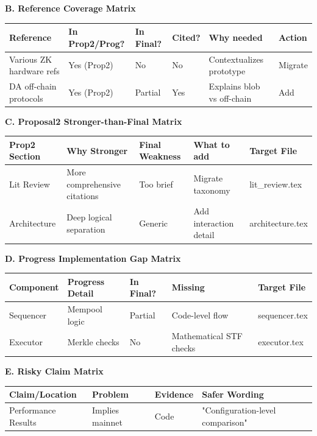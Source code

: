 \documentclass[12pt]{article}
\begin{document}
\vspace{2em}
\noindent\textbf{B. Reference Coverage Matrix} \\
\begin{tabularx}{\textwidth}{|X|l|l|l|X|X|}
\hline
\textbf{Reference} & \textbf{In Prop2/Prog?} & \textbf{In Final?} & \textbf{Cited?} & \textbf{Why needed} & \textbf{Action} \\ \hline
Various ZK hardware refs & Yes (Prop2) & No & No & Contextualizes prototype & Migrate \\ \hline
DA off-chain protocols & Yes (Prop2) & Partial & Yes & Explains blob vs off-chain & Add \\ \hline
\end{tabularx}

\vspace{2em}
\noindent\textbf{C. Proposal2 Stronger-than-Final Matrix} \\
\begin{tabularx}{\textwidth}{|l|X|X|X|l|}
\hline
\textbf{Prop2 Section} & \textbf{Why Stronger} & \textbf{Final Weakness} & \textbf{What to add} & \textbf{Target File} \\ \hline
Lit Review & More comprehensive citations & Too brief & Migrate taxonomy & lit\_review.tex \\ \hline
Architecture & Deep logical separation & Generic & Add interaction detail & architecture.tex \\ \hline
\end{tabularx}

\vspace{2em}
\noindent\textbf{D. Progress Implementation Gap Matrix} \\
\begin{tabularx}{\textwidth}{|l|X|l|X|l|}
\hline
\textbf{Component} & \textbf{Progress Detail} & \textbf{In Final?} & \textbf{Missing} & \textbf{Target File} \\ \hline
Sequencer & Mempool logic & Partial & Code-level flow & sequencer.tex \\ \hline
Executor & Merkle checks & No & Mathematical STF checks & executor.tex \\ \hline
\end{tabularx}

\vspace{2em}
\noindent\textbf{E. Risky Claim Matrix} \\
\begin{tabularx}{\textwidth}{|X|X|X|X|}
\hline
\textbf{Claim/Location} & \textbf{Problem} & \textbf{Evidence} & \textbf{Safer Wording} \\ \hline
Performance Results & Implies mainnet & Code & "Configuration-level comparison" \\ \hline
\end{tabularx}
\end{document}
